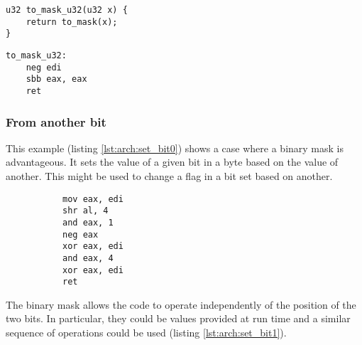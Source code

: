 \begin{multicols}{2}
    \begin{lstlisting}[style=c]
u32 to_mask_u32(u32 x) {
    return to_mask(x);
}
    \end{lstlisting}
    \columnbreak
    \begin{lstlisting}[style=x86]
to_mask_u32:
    neg edi
    sbb eax, eax
    ret
    \end{lstlisting}
\end{multicols}

\subsubsection{From another bit}

This example (listing \ref{lst:arch:set_bit0}) shows a case where a binary mask
is advantageous.  It sets the value of a given bit in a byte based on the value
of another.  This might be used to change a flag in a bit set based on another.

\begin{figure}[ht]
    \centering
    \vspace{-\baselineskip}
    \begin{subfigure}[t]{0.5\textwidth}
        
    \end{subfigure}
    \hspace{2em}
    \begin{subfigure}[t]{0.2\textwidth}
        \begin{lstlisting}[style=x86]
mov eax, edi
shr al, 4
and eax, 1
neg eax
xor eax, edi
and eax, 4
xor eax, edi
ret
        \end{lstlisting}
    \end{subfigure}
    \vspace{-\baselineskip}
\end{figure}

The binary mask allows the code to operate independently of the position of the
two bits.  In particular, they could be values provided at run time and a
similar sequence of operations could be used (listing \ref{lst:arch:set_bit1}).

